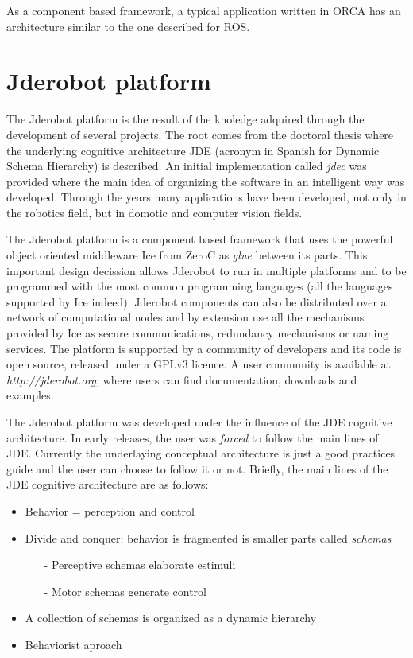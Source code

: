 \documentclass[twocolumn]{svjour3}          %
\begin{document}
As a component based framework, a typical application written in ORCA has an architecture similar to the one described for ROS.


\section{Jderobot platform}
\label{sec:jderobot}
The Jderobot platform is the result of the knoledge adquired through
the development of several projects. The root comes from the doctoral
thesis \cite{canas02} where the underlying cognitive architecture JDE (acronym in Spanish for Dynamic
Schema Hierarchy) is
described. An initial implementation called \textit{jdec} was provided
where the main idea of organizing the
software in an intelligent way was developed. Through the years many
applications have been developed, not only in 
the robotics field, but in domotic and computer vision fields.

The Jderobot platform is a component based framework that uses the powerful object oriented middleware Ice from ZeroC as \textit{glue} between its parts. This important design decission allows Jderobot to run in multiple platforms and to be programmed with the most common programming languages (all the languages supported by Ice indeed). Jderobot components can also be distributed over a network of computational nodes and by extension use all the mechanisms provided by Ice as secure communications, redundancy mechanisms or naming services. The platform is supported by a community of developers and its code is open source, released under a GPLv3 licence. A user community is available at \textit{http://jderobot.org}, where users can find documentation, downloads and examples.

The Jderobot platform was developed under the influence of the JDE cognitive architecture. In early releases, the user was \textit{forced} to follow the main lines of JDE. Currently the underlaying conceptual architecture is just a good practices guide and the user can choose to follow it or not. Briefly, the main lines of the JDE cognitive architecture are as follows:

\begin{itemize}
\item Behavior = {perception} and {control}
\item Divide and conquer: behavior is fragmented is smaller parts called \textit{schemas}
\begin{itemize}
\item[-] Perceptive schemas elaborate estimuli
\item[-] Motor schemas generate control
\end{itemize}
\item A collection of schemas is organized as a dynamic hierarchy
\item Behaviorist aproach
\end{itemize}
\end{document}
